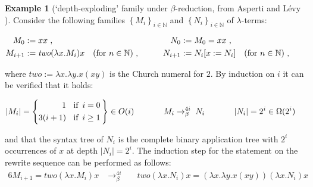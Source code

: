 \documentclass[
submission
]{dmtcs-episciences-tampered}
\newcommand{\fap}[2]{#1({#2})}
\newcommand{\indap}[2]{#1 _{#2}}
\newcommand{\bpap}[3]{#1 _{#2}^{#3}}
\newcommand{\nb}{\nobreakdash}
\newcommand{\nf}{\normalfont}
\newcommand{\sdefdby}{{:=}}
\newcommand{\defdby}{\mathrel{\sdefdby}}
\newcommand{\punc}[1]{\ensuremath{\hspace*{3pt}{#1}}}
\newcommand{\setexp}[1]{\left\{{#1}\right\}}
\newcommand{\family}[2]{\setexp{#1}_{#2}}
\newcommand{\nat}{\mathbb{N}}
\newcommand{\sbigOmicron}{O}
\newcommand{\bigOmicron}{\fap{\sbigOmicron}}
\newcommand{\sbigOmega}{\Omega}
\newcommand{\bigOmega}{\fap{\sbigOmega}}
\newcommand{\avar}{x}
\newcommand{\bvar}{y}
\newcommand{\sdepth}{\text{\nf d}}
\newcommand{\depth}[1]{\lvert{#1}\rvert} \newcommand{\depthbig}[1]{\big\lvert{#1}\big\rvert} \newcommand{\sudepth}{\indap{\sdepth}{\text{\nf u}}}
\newcommand{\alter}{M}
\newcommand{\blter}{N}
\newcommand{\alteri}{\indap{\alter}}
\newcommand{\blteri}{\indap{\blter}}
\newcommand{\twochurch}{\textit{two}}
\newcommand{\sslabs}{\lambda}
\newcommand{\slabs}[1]{\sslabs{#1}.}
\newcommand{\labs}[2]{\slabs{#1}{#2}}
\newcommand{\lapp}[2]{{#1}{#2}}
\newcommand{\substin}[2]{{#1}[{#2}]}
\newcommand{\substinfor}[3]{\substin{#1}{{#2}\defdby{#3}}}
\newcommand{\sred}{\to}
\newcommand{\sredin}[2]{\bpap{\sred}{#1}{#2}}
\newcommand{\sbetaredn}{\sredin{\beta}}
\newcommand{\betaredn}[1]{\mathrel{\sbetaredn{#1}}}
\newcommand{\lambdaterm}{$\lambda$\nb-term}
\newcommand{\lambdaterms}{\lambdaterm{s}}
\newcommand{\betareduction}{$\beta$\nb-re\-duc\-tion}
\theoremstyle{plain}
\theoremstyle{definition}
\newtheorem{example}[theorem]{Example}
\begin{document}
\begin{example}[`depth-exploding' family under \betareduction, from Asperti and L\'{e}vy \cite{aspe:levy:2013}] 
  Consider the following families $\family{\alteri{i}}{i\in\nat}$ and $\family{\blteri{i}}{i\in\nat}$ of \lambdaterms: 
  \begin{center}
    $
    \begin{aligned}
      \alteri{0} & \defdby \lapp{\avar}{\avar} \punc{,}
        & & \quad &   
      \blteri{0} & \defdby \alteri{0} = \lapp{\avar}{\avar} \punc{,}  
      \\
      \alteri{i+1} & \defdby \lapp{\lapp{\twochurch}{(\labs{\avar}{\alteri{i}})}}{\avar} 
        \quad \text{(for $n\in\nat$)} \punc{,}
        & & & 
      \blteri{i+1} & \defdby \substinfor{\blteri{i}}{\avar}{\blteri{i}} 
        \quad \text{(for $n\in\nat$)} \punc{,}
    \end{aligned}  
    $
  \end{center}
where 
  $\twochurch \defdby \labs{\avar}{\labs{\bvar}{\lapp{\avar}{(\lapp{\avar}{\bvar})}}}$
  is the Church numeral for $2$.
  By induction on $i$ it can be verified that it holds:
  \begin{center}
    $
    \begin{aligned}
      \depth{\alteri{i}} 
        & =
       \left\{
       \begin{aligned}
         1 &      \;\;\text{ if }\, i = 0
         \\
         3(i+1) & \;\;\text{ if }\, i\ge 1
       \end{aligned}
       \,\right\} 
       \in \bigOmicron{i}
     \hspace*{6ex} & 
      \alteri{i}
        & \betaredn{4i}\;
      \blteri{i}
     \hspace*{6ex} & 
      \depth{\blteri{i}} & = 2^i \in \bigOmega{2^i}
    \end{aligned}
    $
  \end{center}
  and that the syntax tree of $\blteri{i}$ is the complete binary application tree 
  with $2^i$ occurrences of $\avar$ at depth $\depth{\blteri{i}} = 2^i$.
  The induction step for the statement on the rewrite sequence can be performed as follows:
  \begin{alignat*}{6}
    \alteri{i+1}
      =
    \lapp{\lapp{\twochurch}{(\labs{\avar}{\alteri{i}})}}{\avar}
      & \;\betaredn{4i}\; & & 
    \lapp{\lapp{\twochurch}{(\labs{\avar}{\blteri{i}})}}{\avar}  
      =
    \lapp{\lapp{(\labs{\avar}{\labs{\bvar}{\lapp{\avar}{(\lapp{\avar}{\bvar})}}})}{(\labs{\avar}{\blteri{i}})}}{\avar}  

\end{alignat*}
\end{example}
\end{document}
